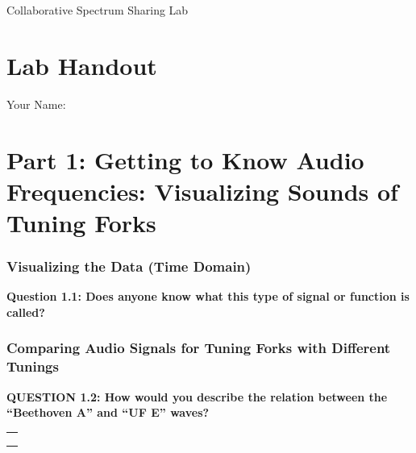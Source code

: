 \documentclass[11pt]{article}
\begin{document}
    
    \begin{center}
{\Huge 
    Collaborative Spectrum Sharing Lab}
\end{center}
 
    

    
    \hypertarget{lab-handout}{%
\section*{Lab Handout}\label{lab-handout}}

Your Name: \underline{\hspace*{3 in}}


\hypertarget{part-1-getting-to-know-audio-frequencies-visualizing-sounds-of-tuning-forks}{%
\section*{Part 1: Getting to Know Audio Frequencies: Visualizing Sounds
of Tuning
Forks}\label{part-1-getting-to-know-audio-frequencies-visualizing-sounds-of-tuning-forks}}

\hypertarget{visualizing-the-data-time-domain}{%
\subsubsection*{Visualizing the Data (Time
Domain)}\label{visualizing-the-data-time-domain}}

\textbf{Question 1.1: Does anyone know what this type of signal or
function is called?}

\hypertarget{comparing-audio-signals-for-tuning-forks-with-different-tunings}{%
\subsubsection*{Comparing Audio Signals for Tuning Forks with Different
Tunings}\label{comparing-audio-signals-for-tuning-forks-with-different-tunings}}

\textbf{QUESTION 1.2: How would you describe the relation between the
``Beethoven A'' and ``UF E'' waves?}

\begin{longtable}[]{@{}l@{}}
\toprule
 \\
\midrule
\endhead
 \\
 \\
 \\
\bottomrule
\end{longtable}
\end{document}
